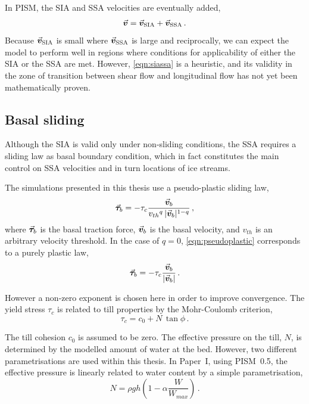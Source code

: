 \documentclass{article}
\newcommand{\vect}[1]{\va*{#1}} %
\newcommand{\vv}[0]{\vect{v}}           %
\newcommand{\vsia}[0]{\vv_{\mathrm{SIA}}}   %
\newcommand{\vssa}[0]{\vv_{\mathrm{SSA}}}   %
\newcommand{\CCLI}[0]{Paper~I}      %
\begin{document}
In PISM, the SIA and SSA velocities are eventually added,
\begin{equation}
    \label{eqn:siassa}
    \vv = \vsia + \vssa \,.
\end{equation}
Because $\vsia$ is small where $\vssa$ is large and
reciprocally, we can expect the model to perform well in regions where
conditions for applicability of either the SIA or the SSA are met. However,
\cref{eqn:siassa} is a heuristic, and its validity in the zone of
transition between shear flow and longitudinal flow has not yet been
mathematically proven.


\subsection{Basal sliding}

Although the SIA is valid only under non-sliding conditions, the SSA requires
a sliding law as basal boundary condition, which in fact constitutes the main
control on SSA velocities and in turn locations of ice streams.

The simulations presented in this thesis use a pseudo-plastic sliding law,
\begin{equation}
    \label{eqn:pseudoplastic}
    \vect{\tau}_b = -\tau_c \frac{\vv_b}{{v_{th}}^q\,|\vv_b|^{1-q}} \,,
\end{equation}
where $\vect{\tau}_b$ is the basal traction force, $\vv_b$ is the basal
velocity, and $v_{th}$ is an arbitrary velocity threshold. In the case of
$q=0$, \cref{eqn:pseudoplastic} corresponds to a purely plastic law,
\begin{equation}
    \label{eqn:plastic}
    \vect{\tau}_b = -\tau_c \frac{\vv_b}{|\vv_b|} \,.
\end{equation}

However a non-zero exponent is chosen here in order to improve convergence. The
yield stress $\tau_c$ is related to till properties by the Mohr-Coulomb
criterion,
\begin{equation}
   \tau_c = c_0 + N\,\tan{\phi} \,.
\end{equation}

The till cohesion $c_0$ is assumed to be zero. The effective pressure on the
till, $N$, is determined by the modelled amount of water at the bed. However,
two different parametrisations are used within this thesis. In {\CCLI}, using
PISM~0.5, the effective pressure is linearly related to water content by a
simple parametrisation,
\begin{equation}
    N = \rho gh (1 - \alpha \frac{W}{W_{max}}) \,.
\end{equation}
\end{document}
